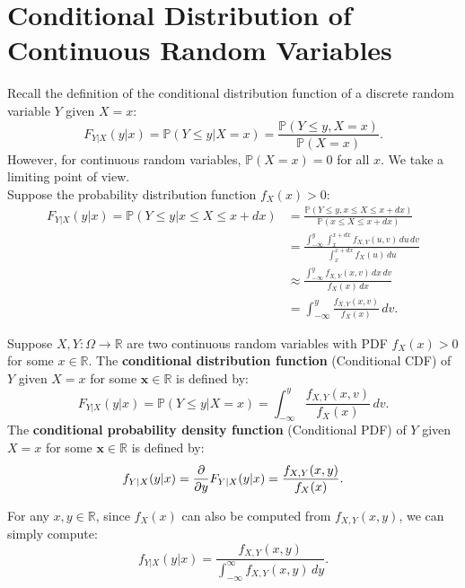 \documentclass{huhtakm-template-book-v2}
\newcommand{\prob}{\mathbb{P}}
\begin{document}
\section{Conditional Distribution of Continuous Random Variables}
    Recall the definition of the conditional distribution function of a discrete random variable $Y$ given $X = x$:
    \begin{equation*}
        F_{Y|X}(y|x) = \prob(Y \leq y|X = x) = \frac{\prob(Y \leq y,X = x)}{\prob(X = x)}.
    \end{equation*}
    However, for continuous random variables, $\prob(X = x) = 0$ for all $x$. We take a limiting point of view.\\
    Suppose the probability distribution function $f_{X}(x) > 0$:
    \begin{align*}
        F_{Y|X}(y|x) = \prob(Y \leq y|x \leq X \leq x+dx) &= \frac{\prob(Y \leq y,x \leq X \leq x+dx)}{\prob(x \leq X \leq x+dx)}\\
        &= \frac{\int_{-\infty}^{y}\int_{x}^{x+dx}f_{X,Y}(u, v)\,du\,dv}{\int_{x}^{x+dx}f_{X}(u)\,du}\\
        &\approx \frac{\int_{-\infty}^{y}f_{X,Y}(x, v)\,dx\,dv}{f_{X}(x)\,dx}\\
        &= \int_{-\infty}^{y}\frac{f_{X,Y}(x, v)}{f_{X}(x)}\,dv.
    \end{align*}
    \begin{defn}
        Suppose $X,Y:\Omega \to \mathbb{R}$ are two continuous random variables with PDF $f_{X}(x) > 0$ for some 
        $x \in \mathbb{R}$. The \textbf{conditional distribution function} (Conditional CDF) of $Y$ given $X = x$ for some $\mathbf{x} \in \mathbb{R}$ is defined by:
        \begin{equation*}
            F_{Y|X}(y|x) = \prob(Y \leq y|X = x) = \int_{-\infty}^{y}\frac{f_{X,Y}(x, v)}{f_{X}(x)}\,dv.
        \end{equation*}
        The \textbf{conditional probability density function} (Conditional PDF) of $Y$ given $X = x$ for some $\mathbf{x} \in \mathbb{R}$ is defined by:
        \begin{equation*}
            f_{Y|X}(y|x) = \pdv*{F_{Y|X}(y|x)}{y} = \frac{f_{X,Y}(x, y)}{f_{X}(x)}.
        \end{equation*}
    \end{defn}
    \begin{rem}
        For any $x,y \in \mathbb{R}$, since $f_{X}(x)$ can also be computed from $f_{X,Y}(x, y)$, we can simply compute:
        \begin{equation*}
            f_{Y|X}(y|x) = \frac{f_{X,Y}(x, y)}{\int_{-\infty}^{\infty} f_{X,Y}(x, y)\,dy}.
        \end{equation*}
    \end{rem}
\end{document}
